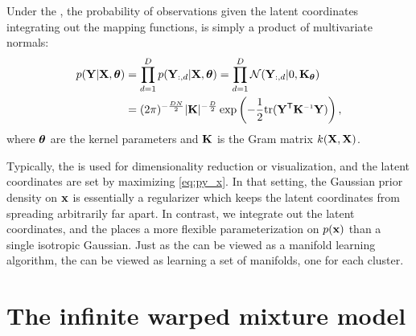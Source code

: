 Under the \gplvm{}, the probability of observations given the latent coordinates integrating out the mapping functions, is simply a product of multivariate normals:
\begin{align}
p(\vY | \vX, \vtheta) 
& = \prod_{d=1}^D p(\vY_{:,d} | \vX, \vtheta) = \prod_{d=1}^D \N{\vY_{:,d}}{0}{\vK_\vtheta} \\ 
& = (2 \pi)^{-\frac{DN}{2}}  |\vK|^{-\frac{D}{2}} \exp \left( -\frac{1}{2} {\rm tr}( \vY\tra \vK\inv \vY) \right),
\label{eq:py_x}
\end{align}
where ${\boldsymbol{\theta}}$ are the kernel parameters and $\mathbf{K}$ is the Gram matrix $k(\mathbf{X}, \mathbf{X})$.

Typically, the \gplvm{} is used for dimensionality reduction or visualization, and the latent coordinates are set by maximizing \eqref{eq:py_x}.
In that setting, the Gaussian prior density on ${\bf{x}}$ is essentially a regularizer which keeps the latent coordinates from spreading arbitrarily far apart.  
In contrast, we integrate out the latent coordinates, and the \iwmm{} places a more flexible parameterization on $p({\bf{x}})$ than a single isotropic Gaussian.
Just as the \gplvm{} can be viewed as a manifold learning algorithm, the \iwmm{} can be viewed as learning a set of manifolds, one for each cluster.





\section{The infinite warped mixture model}
\label{sec:iwmm-definition}

